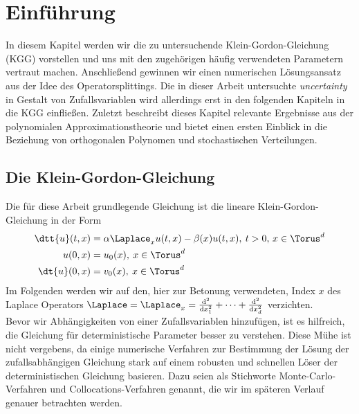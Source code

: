 
\chapter{Einführung}
In diesem Kapitel werden wir die zu untersuchende Klein-Gordon-Gleichung (KGG) vorstellen und uns mit den zugehörigen häufig verwendeten Parametern vertraut machen. Anschließend gewinnen wir einen numerischen Lösungsansatz aus der Idee des Operatorsplittings. Die in dieser Arbeit untersuchte \emph{uncertainty} in Gestalt von Zufallsvariablen wird allerdings erst in den folgenden Kapiteln in die KGG einfließen. Zuletzt beschreibt dieses Kapitel relevante Ergebnisse aus der polynomialen Approximationstheorie und bietet einen ersten Einblick in die Beziehung von orthogonalen Polynomen und stochastischen Verteilungen.
\label{Chapter1}

\section{Die Klein-Gordon-Gleichung}
Die für diese Arbeit grundlegende Gleichung ist die lineare Klein-Gordon-Gleichung in der Form
\begin{align}
\label{kgg}
\dtt{u}(t,x)&=\alpha \Laplace_x u(t,x) - \beta(x)u(t,x), \: t>0, \, x\in \Torus^d\\
u(0,x)&=u_0(x), \: x\in \Torus^d\\
\dt{u}(0,x)&=v_0(x), \: x\in \Torus^d
\end{align}
Im Folgenden werden wir auf den, hier zur Betonung verwendeten, Index $x$ des Laplace Operators $\Laplace=\Laplace_x=\frac{\text{d}^2}{\text{d}x^2_1}+\dots+\frac{\text{d}^2}{\text{d}x^2_d}$ verzichten.\\
Bevor wir Abhängigkeiten von einer Zufallsvariablen hinzufügen, ist es hilfreich, die Gleichung für deterministische Parameter besser zu verstehen. Diese Mühe ist nicht vergebens, da einige numerische Verfahren zur Bestimmung der Lösung der zufallsabhängigen Gleichung stark auf einem robusten und schnellen Löser der deterministischen Gleichung basieren. Dazu seien als Stichworte Monte-Carlo-Verfahren und Collocations-Verfahren genannt, die wir im späteren Verlauf genauer betrachten werden.
